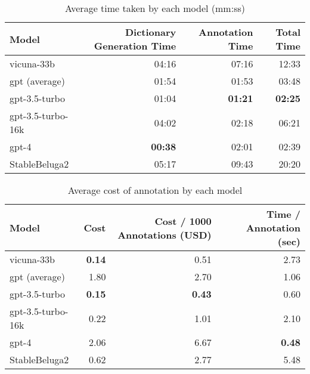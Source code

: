 \begin{table}[htpb]
  \centering
  \begin{tabular}{lrrr}
    \hline
    Model & Dictionary Generation Time & Annotation Time & Total Time \\
    \hline
    vicuna-33b & 04:16 & 07:16 & 12:33 \\
    gpt (average) & 01:54 & 01:53 & 03:48 \\
    gpt-3.5-turbo & 01:04 & \textbf{01:21} & \textbf{02:25} \\
    gpt-3.5-turbo-16k & 04:02 & 02:18 & 06:21 \\
    gpt-4 & \textbf{00:38} & 02:01 & 02:39 \\
    StableBeluga2 & 05:17 & 09:43 & 20:20 \\
    \hline
  \end{tabular}
  \caption[Average time taken]{Average time taken by each model (mm:ss)}
  \label{tab:open-time}
\end{table}

\begin{table}[htpb]
  \centering
  \begin{tabular}{lrrr}
    \hline
    Model & Cost & Cost / 1000 Annotations (USD) & Time / Annotation (sec) \\
    \hline
    vicuna-33b & \textbf{0.14} & 0.51 & 2.73 \\
    gpt (average) & 1.80 & 2.70 & 1.06 \\
    gpt-3.5-turbo & \textbf{0.15} & \textbf{0.43} & 0.60 \\
    gpt-3.5-turbo-16k & 0.22 & 1.01 & 2.10 \\
    gpt-4 & 2.06 & 6.67 & \textbf{0.48} \\
    StableBeluga2 & 0.62 & 2.77 & 5.48 \\
    \hline
  \end{tabular}
  \caption[Cost Analysis]{Average cost of annotation by each model}
  \label{tab:open-cost}
\end{table}
